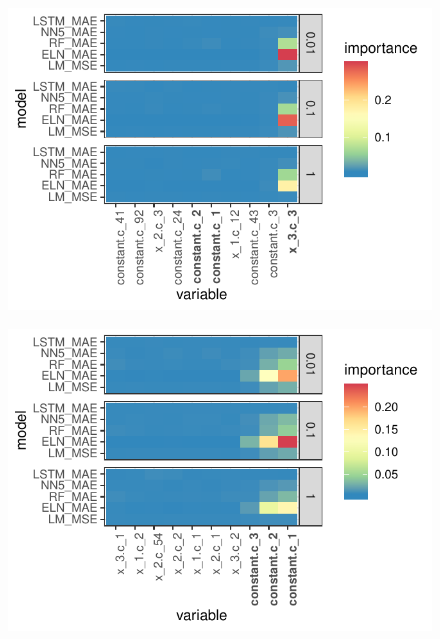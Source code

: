 \documentclass[11pt, a4paper, table]{article}
\begin{document}
\begin{figure}
	\includegraphics[]{../Results/simulation/graphics/simulation_g2_vi.pdf}
\end{figure}

\begin{figure}
	\includegraphics[]{../Results/simulation/graphics/simulation_g3_vi.pdf}
\end{figure}

\end{document}
